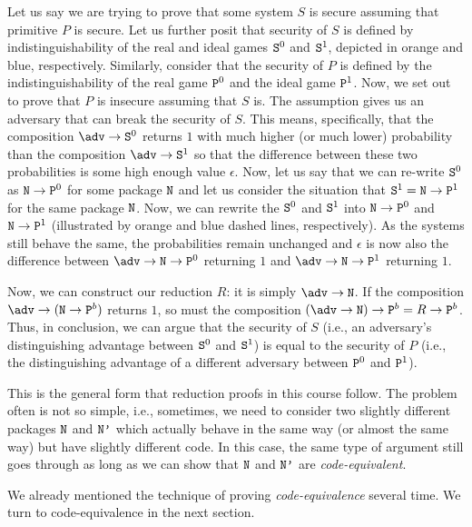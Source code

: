       Let us say we are trying to prove that some system $S$ is secure assuming that primitive $P$ is secure. Let us further posit that security of  $S$ is defined by indistinguishability of the real and ideal games $\text{\texttt{S}}^0$ and $\text{\texttt{S}}^1$, depicted in orange and blue, respectively. Similarly, consider that the security of $P$ is defined by the indistinguishability of the real game $\text{\texttt{P}}^0$ and the ideal game $\text{\texttt{P}}^1$. Now, we set out to prove that $P$ is insecure assuming that $S$ is. The assumption gives us an adversary that can break the security of $S$. This means, specifically, that the composition $\adv\circ\M{S}^0$ returns $1$ with much higher (or much lower) probability than the composition
      $\adv\circ\M{S}^1$ so that the difference between these two probabilities is some high enough value $\epsilon$. Now, let us say that we can re-write $\text{\texttt{S}}^0$ as $\text{\texttt{N}}\rightarrow\text{\texttt{P}}^0$ for some package $\text{\texttt{N}}$ and let us consider the situation that $\text{\texttt{S}}^1=\text{\texttt{N}}\rightarrow\text{\texttt{P}}^1$ for the same package $\text{\texttt{N}}$. Now, we can rewrite the $\text{\texttt{S}}^0$ and $\text{\texttt{S}}^1$ into $\text{\texttt{N}}\rightarrow\text{\texttt{P}}^0$ and $\text{\texttt{N}}\rightarrow\text{\texttt{P}}^1$ (illustrated by orange and blue dashed lines, respectively). As the systems still behave the same, the probabilities remain unchanged and $\epsilon$ is now also the difference between $\adv \circ \M{N} \circ \M{P}^0$ returning $1$ and $\adv \circ \M{N} \circ \M{P}^1$ returning $1$.

      Now, we can construct our reduction $R$: it is simply $\adv \circ \M{N}$. If the composition $\adv \circ (\M{N} \circ \M{P}^b)$ returns $1$, so must the composition $(\adv \circ \M{N}) \circ \M{P}^b = R \circ \M{P}^b$. Thus, in conclusion, we can argue that the security of $S$ (i.e., an adversary's distinguishing advantage between $\text{\texttt{S}}^0$ and $\text{\texttt{S}}^1$) is equal to the security of $P$ (i.e., the distinguishing advantage of a different adversary between $\text{\texttt{P}}^0$ and $\text{\texttt{P}}^1$).

      This is the general form that reduction proofs in this course follow. The problem often is not so simple, i.e., sometimes, we need to consider two slightly different packages $\text{\texttt{N}}$ and $\text{\texttt{N'}}$ which actually behave in the same way (or almost the same way) but have slightly different code. In this case, the same type of argument still goes through as long as we can show that $\text{\texttt{N}}$ and $\text{\texttt{N'}}$ are \emph{code-equivalent}.
\fi

We already mentioned the technique of proving \emph{code-equivalence} several time. We turn to code-equivalence in the next section.